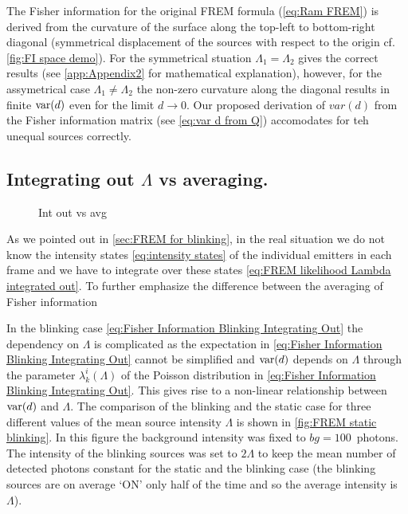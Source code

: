 The Fisher information for the original FREM formula (\autoref{eq:Ram FREM}) is derived from the curvature of the surface along the top-left to bottom-right diagonal (symmetrical displacement of the sources with respect to the origin cf. \autoref{fig:FI space demo}). For the symmetrical stuation $\Lambda_1=\Lambda_2$ gives the correct results (see \autoref{app:Appendix2} for mathematical explanation), however, for the assymetrical case $\Lambda_1\neq\Lambda_2$ the non-zero curvature along the diagonal results in finite $\mathrm{var}(d)$ even for the limit $d\rightarrow 0$. Our proposed derivation of $var(d)$ from the Fisher information matrix (see \autoref{eq:var d from Q}) accomodates for teh unequal sources correctly. 

\subsection{Integrating out $\Lambda$ vs averaging.\label{sub:Int out vs avg}}
\begin{figure}[!hbt]
	\centering
	\newcommand{\wf}{.49\textwidth}
	\caption{Int out vs avg}	
	\label{fig:FREM int out vs avg}
\end{figure}
% 
As we pointed out in \autoref{sec:FREM for blinking}, in the real situation we do not know the intensity states \autoref{eq:intensity states} of the individual emitters in each frame and we have to integrate over these states \autoref{eq:FREM likelihood Lambda integrated out}. To further emphasize the difference between the averaging of Fisher information 



In the blinking case \autoref{eq:Fisher Information Blinking Integrating Out} the dependency on $\Lambda$ is complicated as the expectation in \autoref{eq:Fisher Information Blinking Integrating Out} cannot be simplified and $\mathrm{var}(d)$ depends on $\Lambda$ through the parameter $\lambda_k^i(\Lambda)$ of the Poisson distribution in \autoref{eq:Fisher Information Blinking Integrating Out}. This gives rise to a non-linear relationship between $\mathrm{var}(d)$ and $\Lambda$.
%
The comparison of the blinking and the static case for three different values of the mean source intensity $\Lambda$ is shown in \autoref{fig:FREM static blinking}\aaa. In this figure the background intensity was fixed to $bg=100$~photons. The intensity of the blinking sources was set to $2\Lambda$ to keep the mean number of detected photons constant for the static and the blinking case (the blinking sources are on average `ON' only half of the time and so the average intensity is $\Lambda$). 


